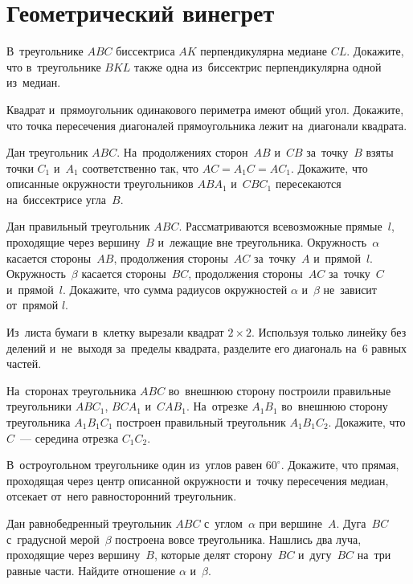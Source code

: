 
\section*{Геометрический винегрет}


\begin{problems}

\item
В~треугольнике $ABC$ биссектриса $AK$ перпендикулярна медиане $CL$.
Докажите, что в~треугольнике $BKL$ также одна из~биссектрис перпендикулярна
одной из~медиан.

\item
Квадрат и~прямоугольник одинакового периметра имеют общий угол.
Докажите, что точка пересечения диагоналей прямоугольника лежит на~диагонали
квадрата.

\item
Дан треугольник $ABC$.
На~продолжениях сторон~$AB$ и~$CB$ за~точку~$B$ взяты точки $C_1$ и~$A_1$
соответственно так, что $AC = A_1 C = A C_1$.
Докажите, что описанные окружности треугольников $A B A_1$ и~$C B C_1$
пересекаются на~биссектрисе угла~$B$.

\item
Дан правильный треугольник $ABC$.
Рассматриваются всевозможные прямые~$l$, проходящие через вершину~$B$ и~лежащие
вне треугольника.
Окружность~$\alpha$ касается стороны~$AB$, продолжения стороны~$AC$
за~точку~$A$ и~прямой~$l$.
Окружность~$\beta$ касается стороны~$BC$, продолжения стороны~$AC$ за~точку~$C$
и~прямой~$l$.
Докажите, что сумма радиусов окружностей $\alpha$ и~$\beta$ не~зависит
от~прямой $l$.

\item
Из~листа бумаги в~клетку вырезали квадрат $2 \times 2$.
Используя только линейку без делений и~не~выходя за~пределы квадрата, разделите
его диагональ на~$6$ равных частей.

\item
На~сторонах треугольника $ABC$ во~внешнюю сторону построили правильные
треугольники $A B C_1$, $B C A_1$ и~$C A B_1$.
На~отрезке $A_1 B_1$ во~внешнюю сторону треугольника $A_1 B_1 C_1$ построен
правильный треугольник $A_1 B_1 C_2$.
Докажите, что $C$~--- середина отрезка $C_1 C_2$.

\item
В~остроугольном треугольнике один из~углов равен $60^{\circ}$.
Докажите, что прямая, проходящая через центр описанной окружности и~точку
пересечения медиан, отсекает от~него равносторонний треугольник.

\item
Дан равнобедренный треугольник $ABC$ с~углом~$\alpha$ при вершине~$A$.
Дуга~$BC$ с~градусной мерой~$\beta$ построена вовсе треугольника.
Нашлись два луча, проходящие через вершину~$B$, которые делят сторону~$BC$
и~дугу~$BC$ на~три равные части.
Найдите отношение $\alpha$ и~$\beta$.

\end{problems}

